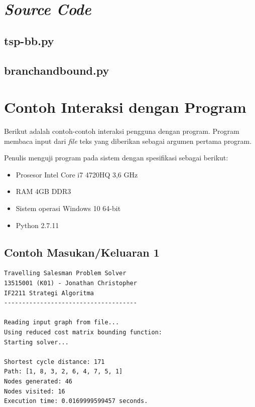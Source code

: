\documentclass[a4paper,titlepage]{article}
\begin{document}
	\section{\textit{Source Code}}

		\subsection{tsp-bb.py}
		

		\subsection{branchandbound.py}
		

	\section{Contoh Interaksi dengan Program}

		Berikut adalah contoh-contoh interaksi pengguna dengan program. Program membaca input dari \textit{file} teks yang diberikan sebagai argumen pertama program.

		\noindent Penulis menguji program pada sistem dengan spesifikasi sebagai berikut:
		\begin{itemize}
			\item Prosesor Intel Core i7 4720HQ 3,6 GHz
			\item RAM 4GB DDR3
			\item Sistem operasi Windows 10 64-bit
			\item Python 2.7.11
		\end{itemize}

		\subsection{Contoh Masukan/Keluaran 1}

		

		\begin{lstlisting}
Travelling Salesman Problem Solver
13515001 (K01) - Jonathan Christopher
IF2211 Strategi Algoritma
-------------------------------------

Reading input graph from file...
Using reduced cost matrix bounding function:
Starting solver...

Shortest cycle distance: 171
Path: [1, 8, 3, 2, 6, 4, 7, 5, 1]
Nodes generated: 46
Nodes visited: 16
Execution time: 0.0169999599457 seconds.
		\end{lstlisting}
\end{document}
